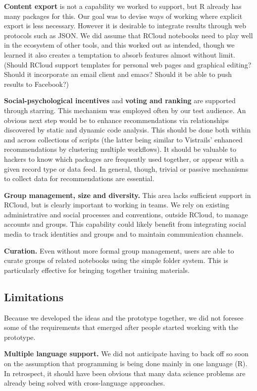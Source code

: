 {\bf Content export} is not a capability we worked to support,
but R already has many packages for this. Our goal was to devise
ways of working where explicit export is less necessary.
However it is desirable to integrate results
through web protocols such as JSON. We did assume that RCloud
notebooks need to play well in the ecosystem of other tools,
and this worked out as intended, though we learned it also creates
a temptation to absorb features almost without limit. (Should
RCloud support templates for personal web pages and graphical
editing? Should it incorporate an email client and emacs?
Should it be able to push results to Facebook?)

{\bf Social-psychological incentives} and {\bf voting and ranking}
are supported through starring. This mechanism was employed often
by our test audience. An obvious next step would be to enhance
recommendations via relationships discovered by static and
dynamic code analysis. This should be done both within and across
collections of scripts (the latter being similar to Vistrails'
enhanced recommendations by clustering multiple workflows).
It should be valuable to hackers to know which packages are
frequently used together, or appear with a given record type
or data feed. In general, though, trivial or passive mechanisms
to collect data for recommendations are essential.

{\bf Group management, size and diversity.} This area lacks sufficient
support in RCloud, but is clearly important to working in teams.
We rely on existing administrative and social processes and conventions,
outside RCloud, to manage accounts and groups. This capability
could likely benefit from integrating social media to track
identities and groups and to maintain communication channels.

{\bf Curation.} Even without more formal group management, users are
able to curate groups of related notebooks using the simple folder
system.  This is particularly effective for bringing together
training materials.

\subsection{Limitations}

Because we developed the ideas and the prototype together,
we did not foresee some of the requirements that emerged
after people started working with the prototype.

{\bf Multiple language support.}
We did not anticipate having to back off so soon on the
assumption that programming is being done mainly in one
language (R). In retrospect, it should have been obvious
that many data science problems are already being solved
with cross-language approaches.

